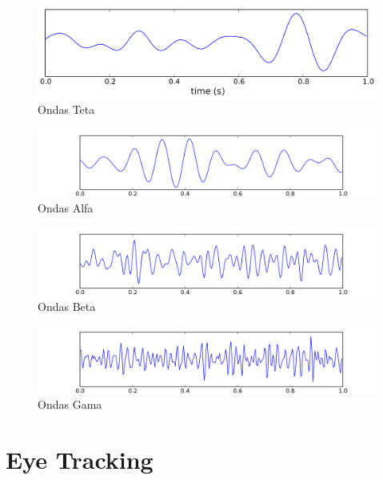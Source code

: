 \documentclass{report}
\begin{document}
\begin{figure}
    \centering
    \includegraphics[width=0.6\linewidth]{Eeg_theta.svg.png}
    \caption{Ondas Teta}
    \label{fig:2.3}
\end{figure}

\begin{figure}
    \centering
    \includegraphics[width=0.7\linewidth]{Eeg_alpha.svg.png}
    \caption{Ondas Alfa}
    \label{fig:2.4}
\end{figure}

\begin{figure}
    \centering
    \includegraphics[width=0.7\linewidth]{Eeg_beta.svg.png}
    \caption{Ondas Beta}
    \label{fig:2.5}
\end{figure}

\begin{figure}
    \centering
    \includegraphics[width=0.7\linewidth]{Eeg_gamma.svg.png}
    \caption{Ondas Gama}
    \label{fig:2.6}
\end{figure}



\chapter{Eye Tracking}
\label{chap.ET}
\end{document}
